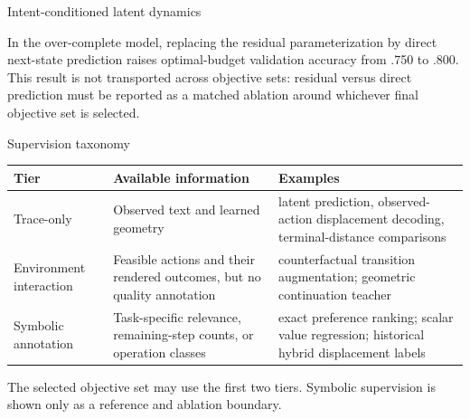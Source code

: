 \documentclass[aspectratio=169,10pt]{beamer}
\begin{document}
\begin{frame}{Intent-conditioned latent dynamics}
\begin{center}
\end{center}

In the over-complete model, replacing the residual parameterization by direct
next-state prediction raises optimal-budget validation accuracy from .750 to
.800. This result is not transported across objective sets: residual versus
direct prediction must be reported as a matched ablation around whichever
final objective set is selected.
\end{frame}

\begin{frame}{Supervision taxonomy}
\small
\begin{tabular}{p{}p{}p{}}
\toprule
Tier & Available information & Examples\\
\midrule
Trace-only & Observed text and learned geometry & latent prediction,
observed-action displacement decoding, terminal-distance comparisons\\
Environment interaction & Feasible actions and their rendered outcomes, but
no quality annotation & counterfactual transition augmentation; geometric
continuation teacher\\
Symbolic annotation & Task-specific relevance, remaining-step counts, or
operation classes & exact preference ranking; scalar value regression;
historical hybrid displacement labels\\
\bottomrule
\end{tabular}

\medskip
The selected objective set may use the first two tiers. Symbolic supervision is shown
only as a reference and ablation boundary.
\end{frame}
\end{document}
